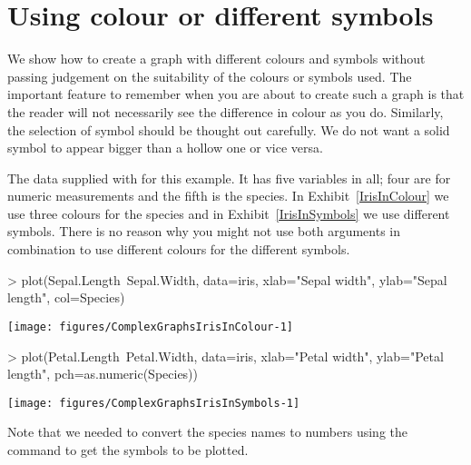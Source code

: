 \section{Using colour or different symbols} 
 
We show how to create a graph with different colours and symbols without passing judgement on the suitability of the colours or symbols used. The important feature to remember when you are about to create such a graph is that the reader will not necessarily see the difference in colour as you do. Similarly, the selection of symbol should be thought out carefully. We do not want a solid symbol to appear bigger than a hollow one or vice versa. 
 
The  data supplied with \R{} for this example. It has five variables in all; four are for numeric measurements and the fifth is the species. In Exhibit~\ref{IrisInColour} we use three colours for the species and in Exhibit~\ref{IrisInSymbols} we use different symbols. There is no reason why you might not use both arguments in combination to use different colours for the different symbols. 
 
\begin{exhibit} 
\begin{center} 
\caption{} 
\label{IrisInColour} 

\begin{Schunk}
\begin{Sinput}
> plot(Sepal.Length~Sepal.Width, data=iris, xlab="Sepal width", ylab="Sepal length", col=Species) 
\end{Sinput}

\texttt{[image: figures/ComplexGraphsIrisInColour-1]} \end{Schunk}

\end{center} 
\end{exhibit} 
 
\begin{exhibit} 
\begin{center} 
\caption{} 
\label{IrisInSymbols} 

\begin{Schunk}
\begin{Sinput}
> plot(Petal.Length~Petal.Width, data=iris, xlab="Petal width", ylab="Petal length", pch=as.numeric(Species)) 
\end{Sinput}

\texttt{[image: figures/ComplexGraphsIrisInSymbols-1]} \end{Schunk}

\end{center} 
\end{exhibit} 
Note that we needed to convert the species names to numbers using the  command to get the symbols to be plotted. 
 
